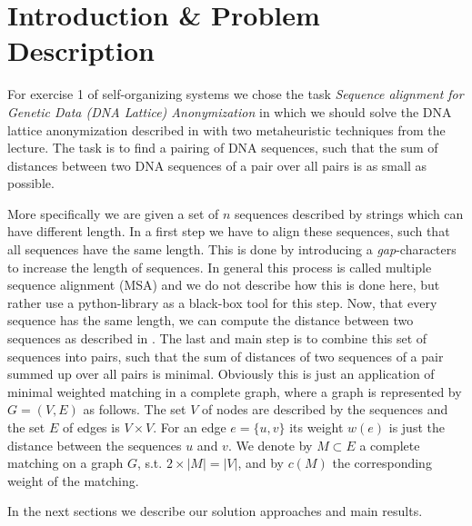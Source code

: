 \documentclass[12pt]{article}
\begin{document}
\maketitle

\section{Introduction \& Problem Description}
For exercise 1 of self-organizing systems we chose the task \textit{Sequence alignment for Genetic Data (DNA Lattice) Anonymization} in which we should solve the DNA lattice anonymization described in \cite{mainpaper} with two metaheuristic techniques from the lecture.
The task is to find a pairing of DNA sequences, such that the sum of distances between two DNA sequences of a pair over all pairs is as small as possible.

More specifically we are given a set of $n$ sequences described by strings which can have different length.
In a first step we have to align these sequences, such that all sequences have the same length.
This is done by introducing a \textit{gap}-characters to increase the length of sequences.
In general this process is called multiple sequence alignment (MSA) and we do not describe how this is done here, but rather use a python-library as a black-box tool for this step.
Now, that every sequence has the same length, we can compute the distance between two sequences as described in \cite{mainpaper}.
The last and main step is to combine this set of sequences into pairs, such that the sum of distances of two sequences of a pair summed up over all pairs is minimal.
Obviously this is just an application of minimal weighted matching in a complete graph, where a graph is represented by $G=(V,E)$ as follows.
The set $V$ of nodes are described by the sequences and the set $E$ of edges is $V\times V$.
For an edge $e=\{u,v\}$ its weight $w(e)$ is just the distance between the sequences $u$ and $v$. 
We denote by $M \subset E$ a complete matching on a graph $G$, s.t. $2 \times |M| = |V|$, and by $c(M)$ the corresponding weight of the matching.

In the next sections we describe our solution approaches and main results.
\end{document}
